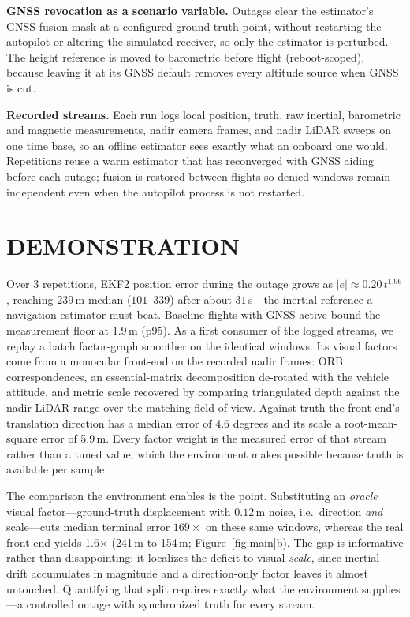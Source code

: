 \documentclass{wscposterproc}
\newcommand{\TODOVIO}{4.6}
\newcommand{\TODOEKF}{241}
\newcommand{\TODOFG}{154}
\newcommand{\TODOSCALE}{5.9}
\newcommand{\TODOGAIN}{1.6}
\begin{document}
\textbf{GNSS revocation as a scenario variable.}
Outages clear the estimator's GNSS fusion mask at a configured ground-truth point,
without restarting the autopilot or altering the simulated receiver, so only the
estimator is perturbed.
The height reference is moved to barometric before flight (reboot-scoped), because
leaving it at its GNSS default removes every altitude source when GNSS is cut.

\textbf{Recorded streams.}
Each run logs local position, truth, raw inertial, barometric and magnetic
measurements, nadir camera frames, and nadir LiDAR sweeps on one time base, so an
offline estimator sees exactly what an onboard one would.
Repetitions reuse a warm estimator that has reconverged with GNSS aiding before each
outage; fusion is restored between flights so denied windows remain independent even
when the autopilot process is not restarted.

\section{DEMONSTRATION}
\label{sec:results}

Over $3$ repetitions, EKF2 position error during the outage grows as
$|e| \approx 0.20\,t^{1.96}$, reaching $239$\,m median ($101$--$339$) after about
$31$\,s---the inertial reference a navigation estimator must beat.
Baseline flights with GNSS active bound the measurement floor at $1.9$\,m (p95).
As a first consumer of the logged streams, we replay a batch factor-graph smoother
on the identical windows.
Its visual factors come from a monocular front-end on the recorded nadir frames:
ORB correspondences, an essential-matrix decomposition de-rotated with the vehicle
attitude, and metric scale recovered by comparing triangulated depth against the
nadir LiDAR range over the matching field of view.
Against truth the front-end's translation direction has a median error of
\TODOVIO{} degrees and its scale a root-mean-square error of \TODOSCALE{}\,m.
Every factor weight is the measured error of that stream rather than a tuned
value, which the environment makes possible because truth is available per sample.

The comparison the environment enables is the point.
Substituting an \emph{oracle} visual factor---ground-truth displacement with
$0.12$\,m noise, i.e.\ direction \emph{and} scale---cuts median terminal error
$169\times$ on these same windows, whereas the real front-end yields
\TODOGAIN{}$\times$
(\TODOEKF{}\,m to \TODOFG{}\,m; Figure~\ref{fig:main}b).
The gap is informative rather than disappointing: it localizes the deficit to
visual \emph{scale}, since inertial drift accumulates in magnitude and a
direction-only factor leaves it almost untouched.
Quantifying that split requires exactly what the environment supplies---a
controlled outage with synchronized truth for every stream.
\end{document}
